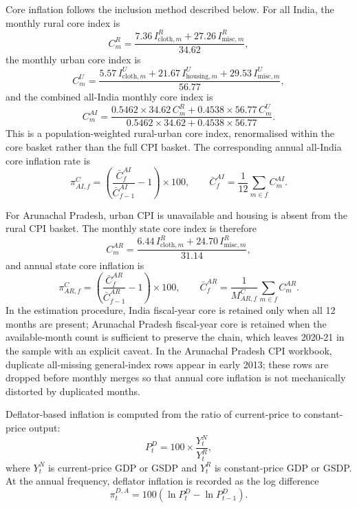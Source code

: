 \documentclass[11pt,a4paper]{article}
\begin{document}
Core inflation follows the inclusion method described below. For all India, the monthly rural core index is
\begin{equation}
C^{R}_{m} = \frac{7.36\,I^{R}_{\mathrm{cloth},m} + 27.26\,I^{R}_{\mathrm{misc},m}}{34.62},
\end{equation}
the monthly urban core index is
\begin{equation}
C^{U}_{m} = \frac{5.57\,I^{U}_{\mathrm{cloth},m} + 21.67\,I^{U}_{\mathrm{housing},m} + 29.53\,I^{U}_{\mathrm{misc},m}}{56.77},
\end{equation}
and the combined all-India monthly core index is
\begin{equation}
C^{AI}_{m} = \frac{0.5462\times 34.62\,C^{R}_{m} + 0.4538\times 56.77\,C^{U}_{m}}{0.5462\times 34.62 + 0.4538\times 56.77}.
\end{equation}
This is a population-weighted rural-urban core index, renormalised within the core basket rather than the full CPI basket. The corresponding annual all-India core inflation rate is
\begin{equation}
\pi^{C}_{AI,f} = \left(\frac{\bar C^{AI}_{f}}{\bar C^{AI}_{f-1}} - 1\right)\times 100,
\qquad
\bar C^{AI}_{f} = \frac{1}{12}\sum_{m \in f} C^{AI}_{m}.
\end{equation}

For Arunachal Pradesh, urban CPI is unavailable and housing is absent from the rural CPI basket. The monthly state core index is therefore
\begin{equation}
C^{AR}_{m} = \frac{6.44\,I^{R}_{\mathrm{cloth},m} + 24.70\,I^{R}_{\mathrm{misc},m}}{31.14},
\end{equation}
and annual state core inflation is
\begin{equation}
\pi^{C}_{AR,f} = \left(\frac{\bar C^{AR}_{f}}{\bar C^{AR}_{f-1}} - 1\right)\times 100,
\qquad
\bar C^{AR}_{f} = \frac{1}{M^{C}_{AR,f}}\sum_{m \in f} C^{AR}_{m}.
\end{equation}
In the estimation procedure, India fiscal-year core is retained only when all 12 months are present; Arunachal Pradesh fiscal-year core is retained when the available-month count is sufficient to preserve the chain, which leaves 2020-21 in the sample with an explicit caveat. In the Arunachal Pradesh CPI workbook, duplicate all-missing general-index rows appear in early 2013; these rows are dropped before monthly merges so that annual core inflation is not mechanically distorted by duplicated months.

Deflator-based inflation is computed from the ratio of current-price to constant-price output:
\begin{equation}
P^{D}_{t} = 100\times \frac{Y^{N}_{t}}{Y^{R}_{t}},
\end{equation}
where $Y^{N}_{t}$ is current-price GDP or GSDP and $Y^{R}_{t}$ is constant-price GDP or GSDP. At the annual frequency, deflator inflation is recorded as the log difference
\begin{equation}
\pi^{D,A}_{t} = 100\left(\ln P^{D}_{t} - \ln P^{D}_{t-1}\right).
\end{equation}
\end{document}
